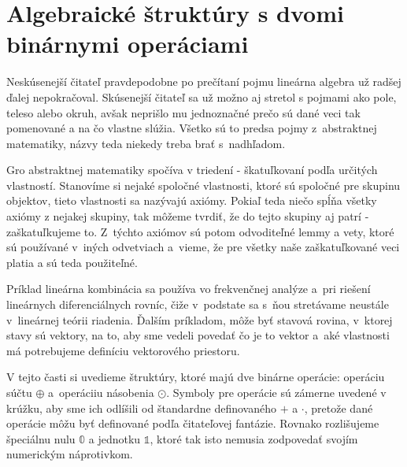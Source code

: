 \documentclass[a4paper, 10pt, ]{article}
\begin{document}
\bigskip

\normalsize
\normalfont



\section{Algebraické štruktúry s dvomi binárnymi operáciami}
\label{TwoBinaryOperationsStructures}

Neskúsenejší čitateľ pravdepodobne po prečítaní pojmu lineárna algebra už radšej ďalej nepokračoval. Skúsenejší čitateľ sa už možno aj stretol s pojmami ako pole, teleso alebo okruh, avšak neprišlo mu jednoznačné prečo sú dané veci tak pomenované a na čo vlastne slúžia. Všetko sú to predsa pojmy z~abstraktnej matematiky, názvy teda niekedy treba brať s~nadhľadom.

Gro abstraktnej matematiky spočíva v triedení - škatuľkovaní podľa určitých vlastností. Stanovíme si nejaké spoločné vlastnosti, ktoré sú spoločné pre skupinu objektov, tieto vlastnosti sa nazývajú axiómy. Pokiaľ teda niečo spĺňa všetky axiómy z nejakej skupiny, tak môžeme tvrdiť, že do tejto skupiny aj patrí - zaškatuľkujeme to. Z~týchto axiómov sú potom odvoditeľné lemmy a vety, ktoré sú používané v~iných odvetviach a~vieme, že pre všetky naše zaškatuľkované veci platia a sú teda použiteľné.

Príklad lineárna kombinácia sa používa vo frekvenčnej analýze a~pri riešení lineárnych diferenciálnych rovníc, čiže v~podstate sa s~ňou stretávame neustále v~lineárnej teórii riadenia. Ďalším príkladom, môže byť stavová rovina, v~ktorej stavy sú vektory, na to, aby sme vedeli povedať čo je to vektor a~aké vlastnosti má potrebujeme definíciu vektorového priestoru.

V tejto časti si uvedieme štruktúry, ktoré majú dve binárne operácie: operáciu súčtu $\oplus$ a~operáciiu násobenia $\odot$. Symboly pre operácie sú zámerne uvedené v krúžku, aby sme ich odlíšili od štandardne definovaného $+$ a $\cdot$, pretože dané operácie môžu byť definované podľa čitateľovej fantázie. Rovnako rozlišujeme špeciálnu nulu $\mathbb{0}$ a jednotku $\mathbb{1}$, ktoré tak isto nemusia zodpovedať svojím numerickým náprotivkom.
\end{document}
